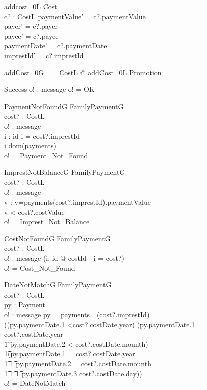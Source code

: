 \documentclass{article}
\begin{document}
\begin{schema}{addcost_0L}
\Delta Cost\\
c? : CostL
\where
paymentValue' = c?.paymentValue\\
payer' = c?.payer\\
payee' = c?.payee\\
paymentDate' = c?.paymentDate\\
imprestId' = c?.imprestId
\end{schema}

\begin{zed}
addCost_0G == \exists \Delta CostL @ addCost_0L \land Promotion
\end{zed}

\begin{schema}{Success}
o! : message
\where
o! = OK
\end{schema}

\begin{schema}{PaymentNotFoundG}
\Xi FamilyPaymentG\\
cost? : CostL\\
o! : message\\
i : id
\where
i = cost?.imprestId\\
i \notin dom(payments)\\
o! = ‫‪Payment‬‬_‫‪Not‬‬_‫‪Found
\end{schema}


\begin{schema}{ImprestNotBalanceG}
\Xi FamilyPaymentG\\
cost? : CostL\\
o! : message\\
v : \nat
\where
v=payments(cost?.imprestId).paymentValue\\
v < cost?.costValue\\
o! = Imprest_Not_Balance
\end{schema}

\begin{schema}{CostNotFoundG}
\Xi FamilyPaymentG\\
cost? : CostL\\
o! : message
\where
\lnot(\exists i: id @ costId~~i = cost?)\\
o! = Cost_Not_Found
\end{schema}

\begin{schema}{DateNotMatchG}
\Xi FamilyPaymentG\\
cost? : CostL\\
py : Payment\\
o! : message
\where
py = payments~~(cost?.imprestId)\\
\lnot((py.paymentDate.1 <cost?.costDate.year) \lor (py.paymentDate.1  = cost?.costDate.year \land \\
\t1 py.paymentDate.2 < cost?.costDate.mounth) \lor\\
\t1(py.paymentDate.1  = cost?.costDate.year \land\\
\t1 \t1 py.paymentDate.2 = cost?.costDate.mounth\land\\
\t1 \t1 \t1 py.paymentDate.3 \le cost?.costDate.day))\\
o! = DateNotMatch
\end{schema}
\end{document}
